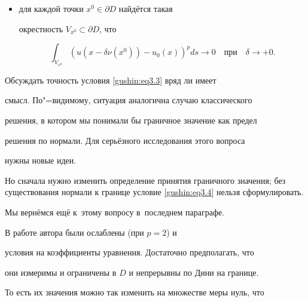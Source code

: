 \begin{itemize}



\item[]

для каждой точки $x^0 \in \partial D$ найдётся такая

окрестность $V_{x^0} \subset \partial D$, что

\begin{equation}

\label{gushin:eq3.4} \int _{V_{x^0}} \left(u(x - \delta

\nu(x^0)) - u_0(x)\right)^p ds \to 0 \quad \text{при} \quad \delta

\to +0.

\end{equation}



\end{itemize}



Обсуждать точность условия \eqref{gushin:eq3.3} вряд ли имеет

смысл. По"=видимому, ситуация аналогична случаю классического

решения, в котором мы понимали бы граничное значение как предел

решения по нормали. Для серьёзного исследования этого вопроса

нужны новые идеи. 




Но сначала нужно изменить определение принятия граничного значения; без существования нормали к границе условие \eqref{gushin:eq3.4} нельзя сформулировать.

Мы вернёмся ещё к~этому вопросу в~последнем параграфе.







В работе автора  \cite{gushin:G88} были ослаблены (при $p = 2$) и

условия на коэффициенты уравнения. Достаточно предполагать, что

они измеримы и ограничены в $D$ и непрерывны по Дини на границе.

То есть их значения можно так изменить на множестве меры нуль, что


